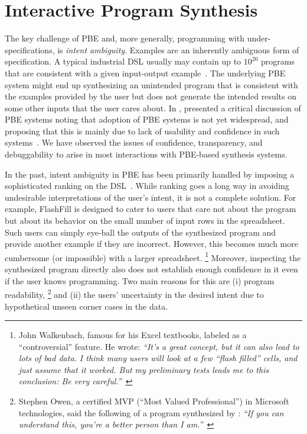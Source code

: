 \chapter{Interactive Program Synthesis}
\label{ch:interactive}

The key challenge of PBE and, more generally, programming with under-specifications, is \emph{intent ambiguity}.
Examples are an inherently ambiguous form of specification.
A typical industrial DSL usually may contain up to $10^{20}$ programs that are consistent with a given input-output
example~\cite{singh2012synthesizing}.
The underlying PBE system might end up synthesizing an unintended program that is consistent with the examples provided
by the user but does not generate the intended results on some other inputs that the user cares about.
In \citeyear{pbd-fail}, \citeauthor{pbd-fail} presented a critical discussion of PBE systems noting that adoption
of PBE systems is not yet widespread, and proposing that this is mainly due to lack of usability
and confidence in such systems~\cite{pbd-fail}.
We have observed the issues of confidence, transparency, and debuggability to arise in most interactions with PBE-based
synthesis systems.

In the past, intent ambiguity in PBE has been primarily handled by imposing a sophisticated ranking on the
DSL~\cite{cav:ranking}.
While ranking goes a long way in avoiding undesirable interpretations of the user's intent, it is not a complete
solution.
For example, FlashFill is designed to cater to users that care not about the program but about its behavior on the small
number of input rows in the spreadsheet.
Such users can simply eye-ball the outputs of the synthesized program and provide another example if they are incorrect.
However, this becomes much more cumbersome (or impossible) with a larger spreadsheet.%
\footnote{John Walkenbach, famous for his Excel textbooks, labeled \ff as a ``controversial'' feature.
    He wrote: \textit{``It's a great concept, but it can also lead to lots of bad data. I think many users will look at
        a few ``flash filled'' cells, and just assume that it worked. But my preliminary tests leads me to this
        conclusion: Be very careful.''}~\cite{walkenbach:controversial}}
Moreover, inspecting the synthesized program directly also does not establish enough confidence in it even if the user
knows programming.
Two main reasons for this are (i) program readability,%
\footnote{Stephen Owen, a certified MVP (``Most Valued Professional'')
  in Microsoft technologies, said the following of a program
  synthesized by \fe: \textit{``If you can understand this, you’re a better person than I am.''}~\cite{mvp:complaint}}
and (ii) the users' uncertainty in the desired intent due to hypothetical unseen corner cases in the data.

